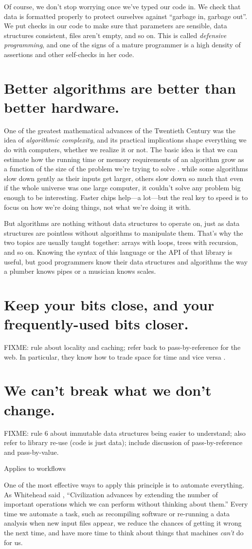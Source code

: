 \documentclass[10pt,letterpaper]{article}
\newcommand{\rulemajor}[1]{\section{#1}}
\begin{document}
Of course, we don't stop worrying once we've typed our code in.  We check that
data is formatted properly to protect ourselves against ``garbage in, garbage
out''.  We put checks in our code to make sure that parameters are sensible,
data structures consistent, files aren't empty, and so on.  This is called
\emph{defensive programming}, and one of the signs of a mature programmer is
a high density of assertions and other self-checks in her code.

\rulemajor{Better algorithms are better than better hardware.}

One of the greatest mathematical advances of the Twentieth Century was the idea
of \emph{algorithmic complexity}, and its practical implications shape
everything we do with computers, whether we realize it or not.  The basic idea
is that we can estimate how the running time or memory requirements of an
algorithm grow as a function of the size of the problem we're trying to solve
\cite{Cone2016}.  while some algorithms slow down gently as their inputs get
larger, others slow down so much that even if the whole universe was one large
computer, it couldn't solve any problem big enough to be interesting.  Faster
chips help---a lot---but the real key to speed is to focus on how we're doing
things, not what we're doing it with.

But algorithms are nothing without data structures to operate on, just as data
structures are pointless without algorithms to manipulate them.  That's why the
two topics are usually taught together: arrays with loops, trees with recursion,
and so on.  Knowing the syntax of this language or the API of that library is
useful, but good programmers know their data structures and algorithms the way a
plumber knows pipes or a musician knows scales.

\rulemajor{Keep your bits close, and your frequently-used bits closer.}

FIXME: rule about locality and caching; refer back to pass-by-reference for the
web.  In particular, they know how to trade space for time and vice versa
\cite{Bent1982}.
  
\rulemajor{We can't break what we don't change.}

FIXME: rule 6 about immutable data structures being easier to understand; also
refer to library re-use (code is just data); include discussion of
pass-by-reference and pass-by-value.

Applies to workflows

One of the most effective ways to apply this principle is to automate
everything.  As Whitehead said \cite{Whit1958}, ``Civilization advances by
extending the number of important operations which we can perform without
thinking about them.''  Every time we automate a task, such as recompiling
software or re-running a data analysis when new input files appear, we reduce
the chances of getting it wrong the next time, and have more time to think about
things that machines \emph{can't} do for us.
\end{document}
